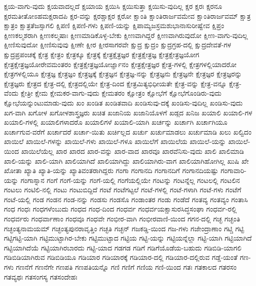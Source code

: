 {ಕ್ಷಯ-ವಾಗು-ವುದು
ಕ್ಷಯವಾದಲ್ಲದೆ
ಕ್ಷಯಾಯ
ಕ್ಷಯಿಸಿ
ಕ್ಷಯಿಸುತ್ತಾ
ಕ್ಷಯಿಸು-ವುದಿಲ್ಲ
ಕ್ಷರ
ಕ್ಷರಃ
ಕ್ಷರನೂ
ಕ್ಷರಮತೀತೋಽಹಮಕ್ಷರಾದಪಿ
ಕ್ಷರ-ವನ್ನು
ಕ್ಷರಶ್ಚಾಕ್ಷರ
ಕ್ಷರೋ
ಕ್ಷಾಂತಿ
ಕ್ಷಾಂತಿರಾರ್ಜವಮೇವ
ಕ್ಷಾಂತಿರಾರ್ಜವಮ್
ಕ್ಷಾತ್ರ
ಕ್ಷಾತ್ರಂ
ಕ್ಷಾತ್ರತೆಜಸ್ಸಾಗಲಿ
ಕ್ಷಿಪಣಿ
ಕ್ಷಿಪಣಿ-ಗಳು
ಕ್ಷಿಪಣಿ-ಯನ್ನು
ಕ್ಷಿಪಾಮ್ಯಜಸ್ರಮಶುಭಾನಾಸುರೀಷ್ವೇವ
ಕ್ಷಿಪ್ರಂ
ಕ್ಷೀಣಕಲ್ಮಶರಾಗಿ
ಕ್ಷೀಣಕಲ್ಮಷಾಃ
ಕ್ಷೀಣಮಾಡಿಕೊಳ್ಳ-ಬೇಕು
ಕ್ಷೀಣವಾಗಿದ್ದರೆ
ಕ್ಷೀಣವಾಗಿರುವುದೋ
ಕ್ಷೀಣ-ವಾಗು-ವುದಿಲ್ಲ
ಕ್ಷೀಣಿಸುವುದೋ
ಕ್ಷೀಣಿಸುವುವು
ಕ್ಷೀಣೇ
ಕ್ಷೀರ
ಕ್ಷೀರಸಾಗರವೇ
ಕ್ಷುದ್ರ
ಕ್ಷುದ್ರಂ
ಕ್ಷುದ್ರಗ್ರಹ-ದಲ್ಲಿ
ಕ್ಷುದ್ರದೇವತೆ-ಗಳ
ಕ್ಷುದ್ರಪ್ರಪಂಚಕ್ಕೆ
ಕ್ಷೇತ್ರ
ಕ್ಷೇತ್ರಂ
ಕ್ಷೇತ್ರಕ್ಕೂ
ಕ್ಷೇತ್ರಕ್ಕೆ
ಕ್ಷೇತ್ರಕ್ಷೆತ್ರಜ್ಞರ
ಕ್ಷೇತ್ರಕ್ಷೇತ್ರಜ್ಞ
ಕ್ಷೇತ್ರಕ್ಷೇತ್ರಜ್ಞಯೋಗ
ಕ್ಷೇತ್ರಕ್ಷೇತ್ರಜ್ಞಯೋರೇವಮಂತರಂ
ಕ್ಷೇತ್ರಕ್ಷೇತ್ರಜ್ಞಯೋರ್ಜ್ಞಾನಂ
ಕ್ಷೇತ್ರಕ್ಷೇತ್ರಜ್ಞರ
ಕ್ಷೇತ್ರ-ಗಳಲ್ಲಿ
ಕ್ಷೇತ್ರಗಳಲ್ಲಿಯಾದರೋ
ಕ್ಷೇತ್ರಗಳಲ್ಲಿಯೂ
ಕ್ಷೇತ್ರಜ್ಞ
ಕ್ಷೇತ್ರಜ್ಞಂ
ಕ್ಷೇತ್ರಜ್ಞಕ್ಕೆ
ಕ್ಷೇತ್ರಜ್ಞನ
ಕ್ಷೇತ್ರಜ್ಞ-ನನ್ನು
ಕ್ಷೇತ್ರಜ್ಞನು
ಕ್ಷೇತ್ರಜ್ಞನೇ
ಕ್ಷೇತ್ರಜ್ಞರ
ಕ್ಷೇತ್ರಜ್ಞರನ್ನು
ಕ್ಷೇತ್ರಜ್ಞರು
ಕ್ಷೇತ್ರದ
ಕ್ಷೇತ್ರ-ದಲ್ಲಿ
ಕ್ಷೇತ್ರದಲ್ಲಿಯೇ
ಕ್ಷೇತ್ರ-ದಿಂದ
ಕ್ಷೇತ್ರಮಿತ್ಯಭಿಧೀಯತೇ
ಕ್ಷೇತ್ರ-ವನ್ನು
ಕ್ಷೇತ್ರ-ವನ್ನೂ
ಕ್ಷೇತ್ರ-ವೆಂದು
ಕ್ಷೇತ್ರೀ
ಕ್ಷೇಮ
ಕ್ಷೇಮಕರ-ವಾಗು-ವುದು
ಕ್ಷೇಮತರಂ
ಕ್ಷೋತ್ರಂ
ಕ್ಷೋಭೆಗೆ
ಕ್ಷೋಭೆಗೊಂಡಿರು-ವುದು
ಕ್ಷೋಭೆಯನ್ನುಂಟುಮಾಡು-ವುದು
ಖಂ
ಖಂಡಿತ
ಖಂಡಿತವಾದಿ
ಖಂಡಿಸುವು-ದಕ್ಕೆ
ಖಂಡಿಸು-ವುದಿಲ್ಲ
ಖಂಡಿಸು-ವುದು
ಖಗ-ವಾಗಿ
ಖಗೋಳ
ಖಗೋಳಶಾಸ್ತ್ರಜ್ಞರು
ಖಚಿತ
ಖಜಾನಿಯ
ಖಜಾನಿಯೊಳಗೆ
ಖಡ್ಗದ
ಖನಿಜ
ಖಯಾಲಿ
ಖಯಾಲಿ-ಗಳ
ಖಯಾಲಿ-ಗಳಲ್ಲಿ
ಖಯಾಲಿಗಳಾದರೊ
ಖಯಾಲಿಗಳೆ
ಖಯಾಲಿ-ಯಾಗಿ
ಖರ್ಚನ್ನು
ಖರ್ಚಾಗಿ
ಖರ್ಚಾಗಿಯೂ
ಖರ್ಚಾಗುವ-ವರೆಗೆ
ಖರ್ಚಾದರೆ
ಖರ್ಚಾ-ಯಿತು
ಖರ್ಚಿಲ್ಲದ
ಖರ್ಚು
ಖರ್ಚುಮಾಡಲು
ಖರ್ಚುಮಾಡಿ
ಖಲು
ಖಲ್ವಿದಂ
ಖಾಯಿಲೆ
ಖಾಯಿಲೆ-ಗಳನ್ನು
ಖಾಯಿಲೆ-ಗಳು
ಖಾಯಿಲೆ-ಗಳೂ
ಖಾಯಿಲೆಗೆ
ಖಾಯಿಲೆಯ
ಖಾಯಿಲೆ-ಯನ್ನು
ಖಾಯಿಲೆ-ಯಿಂದ
ಖಾಯಿಲೆಯೆಲ್ಲ
ಖಾರ
ಖಾರದ
ಖಾರ-ವನ್ನು
ಖಾರ-ವಾದ
ಖಾರವೂ
ಖಾರವೆನಿಸು-ವುದು
ಖಾಲಿ
ಖಾಲಿಮಾಡಿ
ಖಾಲಿ-ಯನ್ನು
ಖಾಲಿ-ಯಾಗಿ
ಖಾಲಿಯಾಗಿದೆ
ಖಾಲಿಯಾಗಿದ್ದು
ಖಾಲಿಯಾಗಿರು-ವಾಗ
ಖಾಲಿಯಾಗಿಹೋಗಿಲ್ಲ
ಖುಷಿ
ಖೇ
ಖೋತಾ
ಖ್ಯಾತಿ
ಖ್ಯಾತಿ-ಯನ್ನು
ಖ್ಯಾತಿವಂತರಾಗಿದ್ದರು
ಗಂಗಾ
ಗಂಗಾನದಿ
ಗಂಗಾನದಿಗೆ
ಗಂಗಾನದಿಯಷ್ಟು
ಗಂಗಾವಾರಿ-ಯನ್ನು
ಗಂಗಾಸ್ನಾನ
ಗಂಗೆ
ಗಂಗೆ-ಯನ್ನು
ಗಂಗೆ-ಯಲ್ಲಿ
ಗಂಗೆಯಲ್ಲಿಯೇ
ಗಂಟನ್ನು
ಗಂಟನ್ನೆಲ್ಲ
ಗಂಟಲಲ್ಲಿ
ಗಂಟಲಿನ
ಗಂಟಲು
ಗಂಟಿಲಿ-ನಲ್ಲಿ
ಗಂಟು
ಗಂಟುಬಿದ್ದಿದೆ
ಗಂಟೆ
ಗಂಟೆಗಟ್ಟಲೆ
ಗಂಟೆ-ಗಳಲ್ಲಿ
ಗಂಟೆ-ಗಳಾಗಿ
ಗಂಟೆ-ಗಳು
ಗಂಟೆಗೆ
ಗಂಟೆ-ಯಲ್ಲಿ
ಗಂಡ
ಗಂಡನ
ಗಂಡ-ನನ್ನು
ಗಂಡಸು
ಗಂಡಸೊ
ಗಂಡಾಂತರ
ಗಂಡು
ಗಂಡೆದೆ
ಗಂತವ್ಯ
ಗಂತವ್ಯಂ
ಗಂತಾಸಿ
ಗಂಧ
ಗಂಧಃ
ಗಂಧಗಳೆಂಬುದು
ಗಂಧದ
ಗಂಧ-ದಿಂದ
ಗಂಧರ್ವ
ಗಂಧರ್ವಯಕ್ಷಾಸುರಸಿದ್ಧಸಂಘಾ
ಗಂಧರ್ವ-ರಲ್ಲಿ
ಗಂಧರ್ವರು
ಗಂಧರ್ವಾಣಾಂ
ಗಂಧವೂ
ಗಂಧವೇ
ಗಂಭೀರ-ವಾಗಿ
ಗಂಭೀರವಾಣಿ-ಯಿಂದ
ಗಗನ-ದಲ್ಲಿ
ಗಚ್ಛ
ಗಚ್ಛಂತಿ
ಗಚ್ಛಂತ್ಯನಾಮಯಮ್
ಗಚ್ಛಂತ್ಯಪುನರಾವೃತ್ತಿಂ
ಗಚ್ಛತಿ
ಗಚ್ಛನ್
ಗಜಕಡ್ಡಿ-ಯಿಂದ
ಗಜ-ಗಳು
ಗಜೇಂದ್ರಾಣಾಂ
ಗಟ್ಚಿ
ಗಟ್ಟಿ
ಗಟ್ಟಿಗಟ್ಟಿ-ಯಾಗಿ
ಗಟ್ಟಿಮುಟ್ಟಾಗಿರ-ಬೇಕು
ಗಟ್ಟಿಮುಟ್ಟಾದ
ಗಟ್ಟಿಯ
ಗಟ್ಟಿ-ಯನ್ನು
ಗಟ್ಟಿಯನ್ನೆಲ್ಲಾ
ಗಟ್ಟಿ-ಯಾಗಿ
ಗಟ್ಟಿಯಾಗಿದೆ
ಗಟ್ಟಿಯಾಗಿದೆಯೆ
ಗಟ್ಟಿಯಾಗಿರಬಾರದು
ಗಟ್ಟಿ-ಯಾದ
ಗಡಗಡ
ಗಡಿಗೆ
ಗಡಿಗೆಯೊಡೆಯ-ಬಹುದು
ಗಡಿಬಿಡಿ-ಯಾಗಲಿ
ಗಡಿಬಿಡಿಯಾಗಿರುವ
ಗಡಿಬಿಡಿಯೂ
ಗಡಿಯಾರ
ಗಡಿಯಾರಕ್ಕೆ
ಗಡಿಯಾರ-ದಲ್ಲಿ
ಗಡಿಯಾರ-ದಲ್ಲಿರುವ
ಗಡ್ಡೆ-ಯಂತೆ
ಗಣ-ಗಳು
ಗಣನೆಗೆ
ಗಣನೆಗೇ
ಗಣಪತಿ
ಗಣಪತಿಯನ್ನೊ
ಗಣಿ
ಗಣಿಗೆ
ಗಣಿಯ
ಗಣಿ-ಯಿಂದ
ಗತಃ
ಗತಕಾಲದ
ಗತರಸಂ
ಗತವ್ಯಥಃ
ಗತಸಂಗಸ್ಯ
ಗತಸಂದೇಹಃ
}
